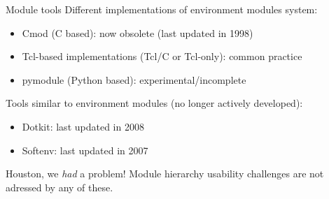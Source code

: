 \documentclass[10pt,xcolor={usenames,dvipsnames}]{beamer}
\begin{document}

\begin{frame}{Module tools}
Different implementations of environment modules system:
\begin{itemize}
    \item
        Cmod (C based): now obsolete (last updated in 1998)
    \item
        Tcl-based implementations (Tcl/C or Tcl-only): common practice
    \item
        pymodule (Python based): experimental/incomplete
\end{itemize}
Tools similar to environment modules (no longer actively developed):
\begin{itemize}
    \item
        Dotkit: last updated in 2008
    \item
        Softenv: last updated in 2007
\end{itemize}

\begin{center}
    \begin{minipage}{0.9\textwidth}
        \begin{alertblock}{Houston, we \emph{had} a problem!}
            \footnotesize
            Module hierarchy usability challenges are not adressed by any of these.
        \end{alertblock}
    \end{minipage}
\end{center}
\end{frame}

\end{document}

